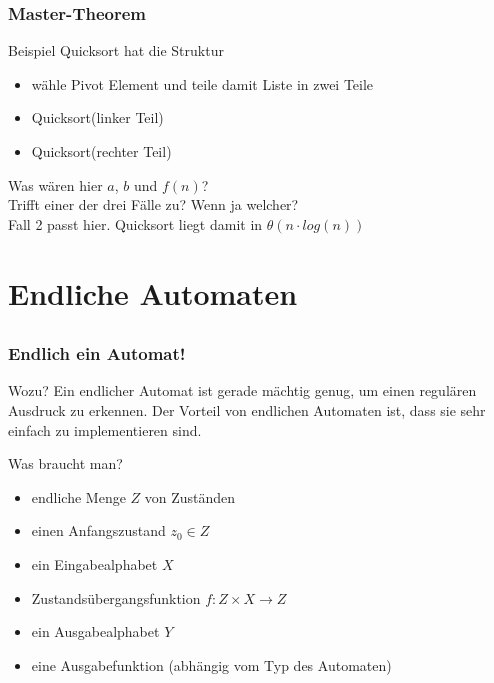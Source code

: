 \begin{frame}
  \frametitle{Master-Theorem}

  \begin{block}{Beispiel}
   Quicksort hat die Struktur
    \begin{itemize}
    \item wähle Pivot Element und teile damit Liste in zwei Teile
    \item Quicksort(linker Teil)
    \item Quicksort(rechter Teil)
    \end{itemize}
   
   Was wären hier $a$, $b$ und $f(n)$? \pause \\ 
   Trifft einer der drei Fälle zu? Wenn ja welcher? \pause \\ 
   Fall 2 passt hier. Quicksort liegt damit in $\theta (n\cdot log(n))$
  \end{block}
\end{frame}

\section{Endliche Automaten} %
\subsection*{}
\begin{frame}
  \frametitle{Endlich ein Automat!}

  \begin{block}{Wozu?}
    Ein endlicher Automat ist gerade mächtig genug, um einen regulären Ausdruck zu erkennen. Der Vorteil von endlichen Automaten ist, dass sie sehr einfach zu implementieren sind.
  \end{block}
  \pause
  \begin{block}{Was braucht man?}
    \begin{itemize}
      \item endliche Menge $Z$ von Zuständen
      \item einen Anfangszustand $z_0 \in Z$
      \item ein Eingabealphabet $X$
      \item Zustandsübergangsfunktion $f:Z \times X \rightarrow Z$
      \item ein Ausgabealphabet $Y$
      \item eine Ausgabefunktion (abhängig vom Typ des Automaten)
    \end{itemize}
  \end{block}
\end{frame}

